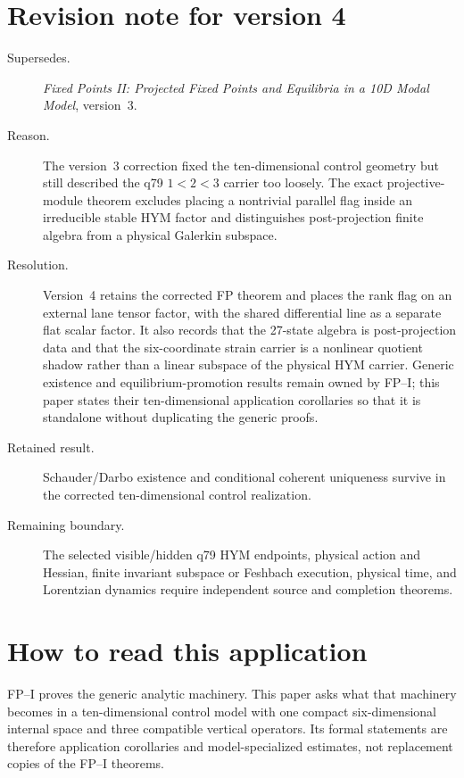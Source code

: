 \documentclass[11pt]{article}
\begin{document}
\section*{Revision note for version 4}
\begin{description}
\item[Supersedes.] \emph{Fixed Points II: Projected Fixed Points and
Equilibria in a 10D Modal Model}, version~3.
\item[Reason.] The version~3 correction fixed the ten-dimensional control
geometry but still described the q79 $1<2<3$ carrier too loosely. The exact
projective-module theorem excludes placing a nontrivial parallel flag inside
an irreducible stable HYM factor and distinguishes post-projection finite
algebra from a physical Galerkin subspace.
\item[Resolution.] Version~4 retains the corrected FP theorem and places the
rank flag on an external lane tensor factor, with the shared differential line
as a separate flat scalar factor. It also records that the 27-state algebra is
post-projection data and that the six-coordinate strain carrier is a nonlinear
quotient shadow rather than a linear subspace of the physical HYM carrier.
Generic existence and equilibrium-promotion results remain owned by FP--I;
this paper states their ten-dimensional application corollaries so that it is
standalone without duplicating the generic proofs.
\item[Retained result.] Schauder/Darbo existence and conditional coherent
uniqueness survive in the corrected ten-dimensional control realization.
\item[Remaining boundary.] The selected visible/hidden q79 HYM endpoints,
physical action and Hessian, finite invariant subspace or Feshbach execution,
physical time, and Lorentzian dynamics require independent source and
completion theorems.
\end{description}

\section*{How to read this application}
FP--I proves the generic analytic machinery.  This paper asks what that
machinery becomes in a ten-dimensional control model with one compact
six-dimensional internal space and three compatible vertical operators.  Its
formal statements are therefore application corollaries and
model-specialized estimates, not replacement copies of the FP--I theorems.
\end{document}
